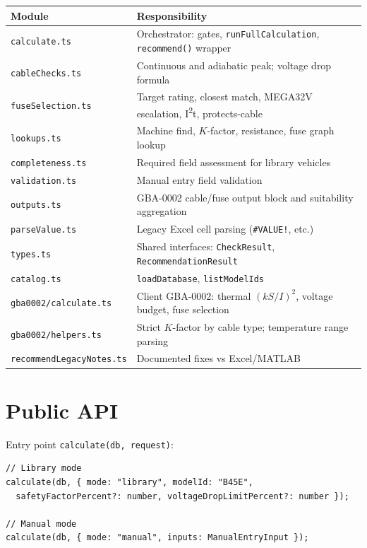 \documentclass[11pt,a4paper]{report}
\begin{document}
\begin{longtable}{@{}p{3.5cm}p{9.5cm}@{}}
  \toprule
  \textbf{Module} & \textbf{Responsibility} \\
  \midrule
  \endhead
  \texttt{calculate.ts} & Orchestrator: gates, \texttt{runFullCalculation}, \texttt{recommend()} wrapper \\
  \texttt{cableChecks.ts} & Continuous and adiabatic peak; voltage drop formula \\
  \texttt{fuseSelection.ts} & Target rating, closest match, MEGA32V escalation, I\textsuperscript{2}t, protects-cable \\
  \texttt{lookups.ts} & Machine find, $K$-factor, resistance, fuse graph lookup \\
  \texttt{completeness.ts} & Required field assessment for library vehicles \\
  \texttt{validation.ts} & Manual entry field validation \\
  \texttt{outputs.ts} & GBA-0002 cable/fuse output block and suitability aggregation \\
  \texttt{parseValue.ts} & Legacy Excel cell parsing (\texttt{\#VALUE!}, etc.) \\
  \texttt{types.ts} & Shared interfaces: \texttt{CheckResult}, \texttt{RecommendationResult} \\
  \texttt{catalog.ts} & \texttt{loadDatabase}, \texttt{listModelIds} \\
  \texttt{gba0002/calculate.ts} & Client GBA-0002: thermal $(kS/I)^2$, voltage budget, fuse selection \\
  \texttt{gba0002/helpers.ts} & Strict $K$-factor by cable type; temperature range parsing \\
  \texttt{recommendLegacyNotes.ts} & Documented fixes vs Excel/MATLAB \\
  \bottomrule
\end{longtable}

\section{Public API}

Entry point \texttt{calculate(db, request)}:

\begin{lstlisting}[style=ts]
// Library mode
calculate(db, { mode: "library", modelId: "B45E",
  safetyFactorPercent?: number, voltageDropLimitPercent?: number });

// Manual mode
calculate(db, { mode: "manual", inputs: ManualEntryInput });
\end{lstlisting}
\end{document}
